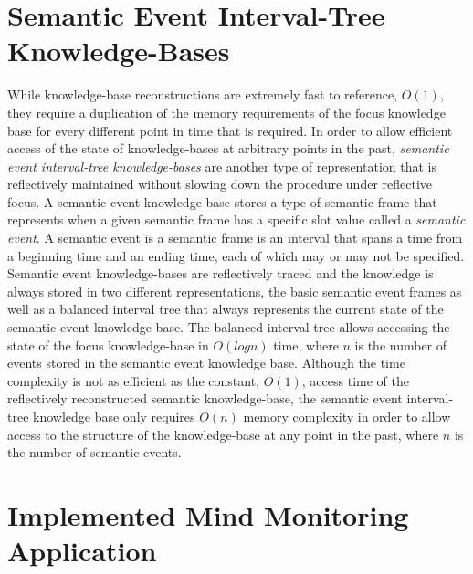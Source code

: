\section{Semantic Event Interval-Tree Knowledge-Bases}

While knowledge-base reconstructions are extremely fast to reference,
$O(1)$, they require a duplication of the memory requirements of the
focus knowledge base for every different point in time that is
required.  In order to allow efficient access of the state of
knowledge-bases at arbitrary points in the past, \emph{semantic event
  interval-tree knowledge-bases} are another type of representation
that is reflectively maintained without slowing down the procedure
under reflective focus.  A semantic event knowledge-base stores a type
of semantic frame that represents when a given semantic frame has a
specific slot value called a \emph{semantic event}.  A semantic event
is a semantic frame is an interval that spans a time from a beginning
time and an ending time, each of which may or may not be specified.
Semantic event knowledge-bases are reflectively traced and the
knowledge is always stored in two different representations, the basic
semantic event frames as well as a balanced interval tree that always
represents the current state of the semantic event knowledge-base.
The balanced interval tree allows accessing the state of the focus
knowledge-base in $O(log n)$ time, where $n$ is the number of events
stored in the semantic event knowledge base.  Although the time
complexity is not as efficient as the constant, $O(1)$, access time of
the reflectively reconstructed semantic knowledge-base, the semantic
event interval-tree knowledge base only requires $O(n)$ memory
complexity in order to allow access to the structure of the
knowledge-base at any point in the past, where $n$ is the number of
semantic events.

\section{Implemented Mind Monitoring Application}

